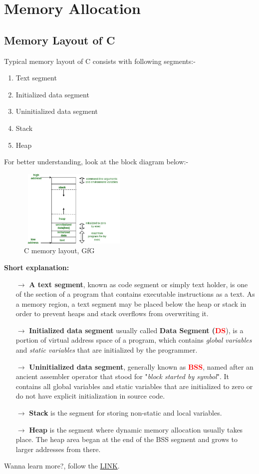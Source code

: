 \documentclass[10 pt]{book}
\begin{document}
\section{Memory Allocation}
\subsection{Memory Layout of C}
Typical memory layout of C consists with following segments:-
\begin{enumerate}
	\item Text segment
	\item Initialized data segment
	\item Uninitialized data segment
	\item Stack
	\item Heap
\end{enumerate}
For better understanding, look at the block diagram below:-\\
\begin{figure}
	\centering
	\includegraphics[width=200px, height=140px]{C memory layout, GfG.png}
	\caption{C memory layout, GfG}
\end{figure}
\pagebreak

\textbf{Short explanation:}
\begin{itemize}
	\item[$\rightarrow$] \textbf{A text segment}, known as code segment or simply text holder, is one of the section of a program that contains executable instructions as a text. As a memory region, a text segment may be placed below the heap or stack in order to prevent heaps and stack overflows from overwriting it.
	\item[$\rightarrow$] \textbf{Initialized data segment} usually called \textbf{Data Segment (\textcolor{red}{DS}}), is a portion of virtual address space of a program, which contains \textit{global variables} and \textit{static variables} that are initialized by the programmer.
	\item[$\rightarrow$] \textbf{Uninitialized data segment}, generally known as \textbf{\textcolor{red}{BSS}}, named after an ancient assembler operator that stood for "\textit{block started by symbol}". It contains all global variables and static variables that are initialized to zero or do not have explicit initialization in source code.
	\item[$\rightarrow$] \textbf{Stack} is the segment for storing non-static and local variables.
	\item[$\rightarrow$] \textbf{Heap} is the segment where dynamic memory allocation usually takes place. The heap area began at the end of the BSS segment and grows to larger addresses from there.
\end{itemize}
Wanna learn more?, follow the \href{https://www.geeksforgeeks.org/memory-layout-of-c-program/}{LINK}.
\end{document}
